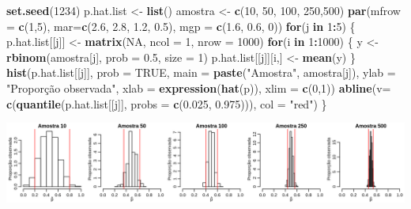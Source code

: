 \documentclass[10pt,a4paper]{book}
\newenvironment{Shaded}{\begin{snugshade}}{\end{snugshade}}
\newcommand{\KeywordTok}[1]{\textcolor[rgb]{0.13,0.29,0.53}{\textbf{#1}}}
\newcommand{\DataTypeTok}[1]{\textcolor[rgb]{0.13,0.29,0.53}{#1}}
\newcommand{\DecValTok}[1]{\textcolor[rgb]{0.00,0.00,0.81}{#1}}
\newcommand{\FloatTok}[1]{\textcolor[rgb]{0.00,0.00,0.81}{#1}}
\newcommand{\StringTok}[1]{\textcolor[rgb]{0.31,0.60,0.02}{#1}}
\newcommand{\OtherTok}[1]{\textcolor[rgb]{0.56,0.35,0.01}{#1}}
\newcommand{\ControlFlowTok}[1]{\textcolor[rgb]{0.13,0.29,0.53}{\textbf{#1}}}
\newcommand{\OperatorTok}[1]{\textcolor[rgb]{0.81,0.36,0.00}{\textbf{#1}}}
\newcommand{\NormalTok}[1]{#1}
\begin{document}
\begin{Shaded}
\begin{Highlighting}[]
\KeywordTok{set.seed}\NormalTok{(}\DecValTok{1234}\NormalTok{)}
\NormalTok{p.hat.list <-}\StringTok{ }\KeywordTok{list}\NormalTok{()}
\NormalTok{amostra <-}\StringTok{ }\KeywordTok{c}\NormalTok{(}\DecValTok{10}\NormalTok{, }\DecValTok{50}\NormalTok{, }\DecValTok{100}\NormalTok{, }\DecValTok{250}\NormalTok{,}\DecValTok{500}\NormalTok{)}
\KeywordTok{par}\NormalTok{(}\DataTypeTok{mfrow =} \KeywordTok{c}\NormalTok{(}\DecValTok{1}\NormalTok{,}\DecValTok{5}\NormalTok{), }\DataTypeTok{mar=}\KeywordTok{c}\NormalTok{(}\FloatTok{2.6}\NormalTok{, }\FloatTok{2.8}\NormalTok{, }\FloatTok{1.2}\NormalTok{, }\FloatTok{0.5}\NormalTok{), }\DataTypeTok{mgp =} \KeywordTok{c}\NormalTok{(}\FloatTok{1.6}\NormalTok{, }\FloatTok{0.6}\NormalTok{, }\DecValTok{0}\NormalTok{))}
\ControlFlowTok{for}\NormalTok{(j }\ControlFlowTok{in} \DecValTok{1}\OperatorTok{:}\DecValTok{5}\NormalTok{) \{}
\NormalTok{  p.hat.list[[j]] <-}\StringTok{ }\KeywordTok{matrix}\NormalTok{(}\OtherTok{NA}\NormalTok{, }\DataTypeTok{ncol =} \DecValTok{1}\NormalTok{, }\DataTypeTok{nrow =} \DecValTok{1000}\NormalTok{)}
  \ControlFlowTok{for}\NormalTok{(i }\ControlFlowTok{in} \DecValTok{1}\OperatorTok{:}\DecValTok{1000}\NormalTok{) \{}
\NormalTok{  y <-}\StringTok{ }\KeywordTok{rbinom}\NormalTok{(amostra[j], }\DataTypeTok{prob =} \FloatTok{0.5}\NormalTok{, }\DataTypeTok{size =} \DecValTok{1}\NormalTok{)}
\NormalTok{  p.hat.list[[j]][i,] <-}\StringTok{ }\KeywordTok{mean}\NormalTok{(y)}
\NormalTok{  \}}
\KeywordTok{hist}\NormalTok{(p.hat.list[[j]], }\DataTypeTok{prob =} \OtherTok{TRUE}\NormalTok{, }\DataTypeTok{main =} \KeywordTok{paste}\NormalTok{(}\StringTok{"Amostra"}\NormalTok{, amostra[j]), }
     \DataTypeTok{ylab =} \StringTok{"Proporção observada"}\NormalTok{,}
     \DataTypeTok{xlab =} \KeywordTok{expression}\NormalTok{(}\KeywordTok{hat}\NormalTok{(p)), }\DataTypeTok{xlim =} \KeywordTok{c}\NormalTok{(}\DecValTok{0}\NormalTok{,}\DecValTok{1}\NormalTok{))}
\KeywordTok{abline}\NormalTok{(}\DataTypeTok{v=} \KeywordTok{c}\NormalTok{(}\KeywordTok{quantile}\NormalTok{(p.hat.list[[j]], }\DataTypeTok{probs =} \KeywordTok{c}\NormalTok{(}\FloatTok{0.025}\NormalTok{, }\FloatTok{0.975}\NormalTok{))), }\DataTypeTok{col =} \StringTok{"red"}\NormalTok{)}
\NormalTok{\}}
\end{Highlighting}
\end{Shaded}

\begin{center}\includegraphics[width=0.99\linewidth]{figures/unnamed-chunk-389-1} \end{center}
\end{document}

